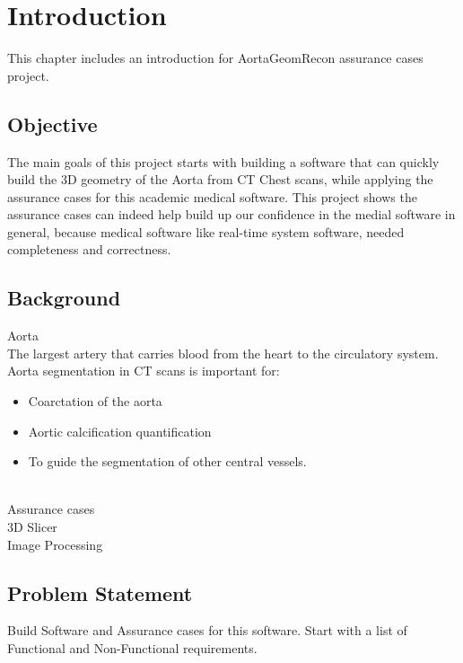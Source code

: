 \chapter{Introduction}
This chapter includes an introduction for AortaGeomRecon assurance cases project. 

%
%

\section{Objective}
The main goals of this project starts with building a software that can quickly build the 3D geometry of the Aorta from CT Chest scans, while applying the assurance cases for this academic medical software. This project shows the assurance cases can indeed help build up our confidence in the medial software in general, because medical software like real-time system software, needed completeness and correctness.


\section{Background}
Aorta  \\
The largest artery that carries blood from the heart to the circulatory system.\\
Aorta segmentation in CT scans is important for:
\begin{itemize}
\item Coarctation of the aorta
\item Aortic calcification quantification
\item To guide the segmentation of other central vessels. 
\end{itemize} ~\\
Assurance cases\\
3D Slicer\\
Image Processing\\

\section{Problem Statement}
Build Software and Assurance cases for this software.
Start with a list of Functional and Non-Functional requirements.
